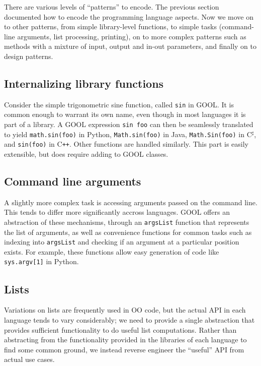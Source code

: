 \documentclass[sigplan,review,anonymous,prologue,dvipsnames]{acmart}
\newcommand{\Csharp}{C$^{\sharp}$}
\newcommand{\Cplusplus}{C\texttt{++}}
\begin{document}
There are various levels of ``patterns'' to encode. The previous section
documented how to encode the programming language aspects. Now we
move on to other patterns, from simple library-level functions, to
simple tasks (command-line arguments, list processing, printing), on to
more complex patterns such as methods with a mixture of input, output
and in-out parameters, and finally on to design patterns.

\subsection{Internalizing library functions}

Consider the simple trigonometric sine function, called \verb|sin| in
GOOL. It is common enough to warrant its own name, even though in most
languages it is part of a library.  A GOOL expression \verb|sin foo|
can then be seamlessly translated to 
yield \verb|math.sin(foo)| in Python, \verb|Math.sin(foo)| in Java,
\verb|Math.Sin(foo)| in \Csharp, and \verb|sin(foo)| in \Cplusplus. Other
functions are handled similarly.  This part is easily extensible, but does
require adding to GOOL classes.

\subsection{Command line arguments}

A slightly more complex task is accessing arguments passed on the command
line. This tends to differ more significantly accross languages. GOOL
offers an abstraction of these mechanisms, through an \verb|argsList| function
that represents the list of arguments, as well as convenience functions for
common tasks such as indexing into \verb|argsList| and checking if an argument
at a particular position exists. For example, these functions allow easy 
generation of code like \verb|sys.argv[1]| in Python. 

\subsection{Lists}

Variations on lists are frequently used in OO code, but the actual API
in each language tends to vary considerably; we need to provide a single
abstraction that provides sufficient functionality to do useful list
computations.  Rather than abstracting from the functionality provided
in the libraries of each language to find some common ground, we instead
reverse engineer the ``useful'' API from actual use cases.  
\end{document}
